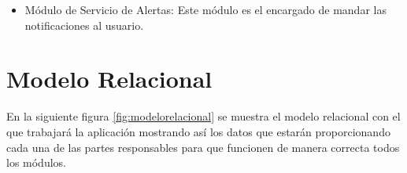 \begin{itemize}
	\item Módulo de Servicio de Alertas: Este módulo es el encargado de mandar las notificaciones al usuario.
	
	
	
	
	
	
	
\end{itemize}
\newpage
\section{Modelo Relacional}
En la siguiente figura \ref{fig:modelorelacional} se muestra el modelo relacional con el que trabajará la aplicación mostrando así los datos que estarán proporcionando cada una de las partes responsables para que funcionen de manera correcta todos los módulos.

